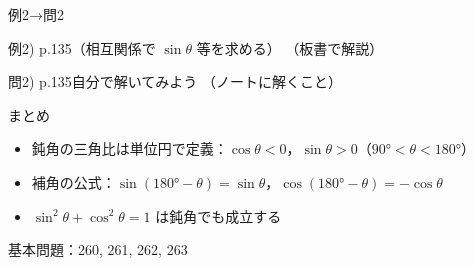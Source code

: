 \documentclass[aspectratio=43,professionalfonts,handout]{beamer}
\begin{document}
\begin{frame}{例2→問2}
  \begin{exampleblock}{例2) p.135（相互関係で $\sin\theta$ 等を求める）}
    （板書で解説）
  \end{exampleblock}

  \vfill

  \begin{block}{問2) p.135\quad 自分で解いてみよう}
    （ノートに解くこと）
  \end{block}
\end{frame}

\begin{frame}{まとめ}
  \begin{itemize}
    \item 鈍角の三角比は単位円で定義：$\cos\theta < 0$，$\sin\theta > 0$（$90° < \theta < 180°$）
    \item 補角の公式：$\sin(180° - \theta) = \sin\theta$，$\cos(180° - \theta) = -\cos\theta$
    \item $\sin^2\theta + \cos^2\theta = 1$ は鈍角でも成立する
  \end{itemize}

  \vfill
  {\small 基本問題：260, 261, 262, 263}
\end{frame}
\end{document}
